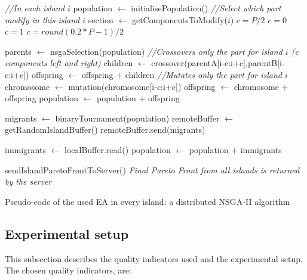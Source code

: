 \documentclass[preprint]{elsarticle}
\begin{document}
\begin{algorithm}[htb]

\begin{algorithmic}
\STATE \textit{//In each island $i$}
\STATE population $\gets$ initialisePopulation()
\STATE \textit{//Select which part modify in this island $i$}
\STATE section $\gets$ getComponentsToModify($i$)
	\STATE $c=P/2$
	\STATE $c=0$
	\STATE $c=1$
	\STATE $c=round(0.2*P-1)/2$
\ENDIF

    \STATE parents $\gets$ nsgaSelection(population)
    	\STATE \textit{//Crossovers only the part for island $i$ (c components left and right)}
    	\STATE children  $\gets$ crossover(parentA[i-c:i+c],parentB[i-c:i+c])
    	\STATE offspring $\gets$ offspring + children
    \ENDFOR
    		\STATE \textit{//Mutates only the part for island $i$}
    		\STATE chromosome $\gets$ mutation(chromosome[i-c:i+c])
    		\STATE offspring $\gets$ chromosome + offspring
    	\ENDIF
    \ENDFOR
    \STATE population $\gets$ population + offspring
    

      \STATE migrants $\gets$ binaryTournament(population)
      \STATE remoteBuffer $\gets$ getRandomIslandBuffer()
      \STATE remoteBuffer.send(migrants)
    \ENDIF

      \STATE immigrants $\gets$ localBuffer.read()
      \STATE population $\gets$ population + immigrants
    \ENDIF
\ENDWHILE

\STATE sendIslandParetoFrontToServer()
\STATE \textit{Final Pareto Front from all islands is returned by the server}
\end{algorithmic}

\caption{Pseudo-code of the used EA in every island: a distributed NSGA-II algorithm }
\label{alg:EA}
\end{algorithm}



%
\subsection{Experimental setup}


This subsection describes the quality indicators used and the experimental setup. The chosen quality indicators, are:
\end{document}
